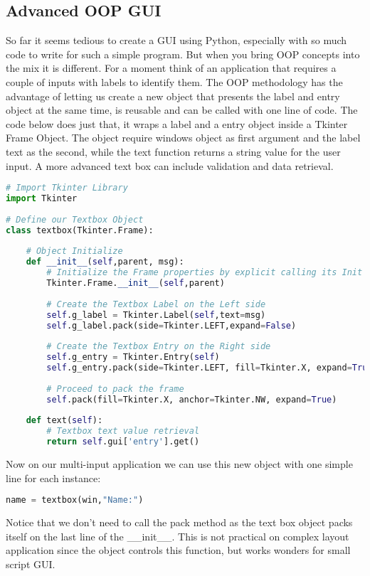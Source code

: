 \subsection{Advanced OOP GUI}
So far it seems tedious to create a GUI using Python, especially with so much
code to write for such a simple program. But when you bring OOP concepts into
the mix it is different. For a moment think of an application that requires a
couple of inputs with labels to identify them. The OOP methodology has the
advantage of letting us create a new object that presents the label and entry
object at the same time, is reusable and can be called with one line of code.
The code below does just that, it wraps a label and a entry object inside a
Tkinter Frame Object. The object require windows object as first argument and
the label text as the second, while the text function returns a string value for
the user input. A more advanced text box can include validation and data
retrieval.
\lstset{basicstyle=\scriptsize, numbers=left, captionpos=b, tabsize=4}
\begin{lstlisting}[caption=OO Tkinter,language={Python},
xleftmargin=15pt, label=lst:ootkinter]
# Import Tkinter Library
import Tkinter
 
# Define our Textbox Object
class textbox(Tkinter.Frame):
 
    # Object Initialize
    def __init__(self,parent, msg):
        # Initialize the Frame properties by explicit calling its Init method
        Tkinter.Frame.__init__(self,parent)
 
        # Create the Textbox Label on the Left side
        self.g_label = Tkinter.Label(self,text=msg)
        self.g_label.pack(side=Tkinter.LEFT,expand=False)
 
        # Create the Textbox Entry on the Right side
        self.g_entry = Tkinter.Entry(self)
        self.g_entry.pack(side=Tkinter.LEFT, fill=Tkinter.X, expand=True)
 
        # Proceed to pack the frame
        self.pack(fill=Tkinter.X, anchor=Tkinter.NW, expand=True)
 
    def text(self):
        # Textbox text value retrieval
        return self.gui['entry'].get()
\end{lstlisting}

Now on our multi-input application we can use this new object with one simple line for each instance:
\lstset{basicstyle=\scriptsize, numbers=left, captionpos=b, tabsize=4}
\begin{lstlisting}[caption=OO Tkinter usage,language={Python},
xleftmargin=15pt, label=lst:ootkinterusage]
name = textbox(win,"Name:")
\end{lstlisting}
Notice that we don't need to call the pack method as the text box object packs
itself on the last line of the \_\_init\_\_. This is not practical on complex layout
application since the object controls this function, but works wonders for small
script GUI.
